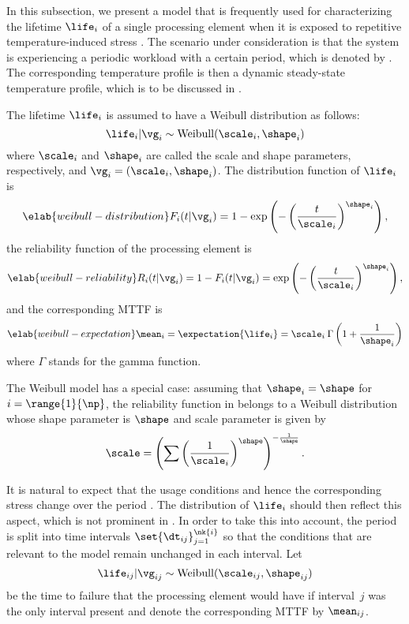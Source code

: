 In this subsection, we present a model that is frequently used for
characterizing the lifetime $\life_i$ of a single processing element when it is
exposed to repetitive temperature-induced stress \cite{huang2009b, xiang2010}.
The scenario under consideration is that the system is experiencing a periodic
workload with a certain period, which is denoted by \period. The corresponding
temperature profile is then a dynamic steady-state temperature profile, which is
to be discussed in .

The lifetime $\life_i$ is assumed to have a Weibull distribution as follows:
\[
  \life_i | \vg_i \sim \mathrm{Weibull}(\scale_i, \shape_i)
\]
where $\scale_i$ and $\shape_i$ are called the scale and shape parameters,
respectively, and $\vg_i = (\scale_i, \shape_i)$. The distribution function of
$\life_i$ is
\begin{equation} \elab{weibull-distribution}
  F_i(t | \vg_i) = 1 - \exp\left(-\left(\frac{t}{\scale_i}\right)^{\shape_i}\right),
\end{equation}
the reliability function of the processing element is
\begin{equation} \elab{weibull-reliability}
  R_i(t | \vg_i) = 1 - F_i(t | \vg_i) = \exp\left(-\left(\frac{t}{\scale_i}\right)^{\shape_i}\right),
\end{equation}
and the corresponding \ac{MTTF} is
\begin{equation} \elab{weibull-expectation}
  \mean_i = \expectation{\life_i} = \scale_i \: \Gamma\left(1 + \frac{1}{\shape_i}\right)
\end{equation}
where $\Gamma$ stands for the gamma function.

\begin{remark} 
The Weibull model has a special case: assuming that $\shape_i = \shape$ for $i =
\range{1}{\np}$, the reliability function in  belongs to
a Weibull distribution whose shape parameter is $\shape$ and scale parameter is
given by
\[
  \scale = \left(\sum\left(\frac{1}{\scale_i}\right)^\shape\right)^{-\frac{1}{\shape}}.
\]
\end{remark}

It is natural to expect that the usage conditions and hence the corresponding
stress change over the period \period. The distribution of $\life_i$ should then
reflect this aspect, which is not prominent in . In
order to take this into account, the period is split into  time intervals
$\set{\dt_{ij}}_{j = 1}^{\nk{i}}$ so that the conditions that are relevant to
the model remain unchanged in each interval. Let
\[
  \life_{ij} | \vg_{ij} \sim \mathrm{Weibull}(\scale_{ij}, \shape_{ij})
\]
be the time to failure that the processing element would have if interval~$j$
was the only interval present and denote the corresponding \ac{MTTF} by
$\mean_{ij}$.

